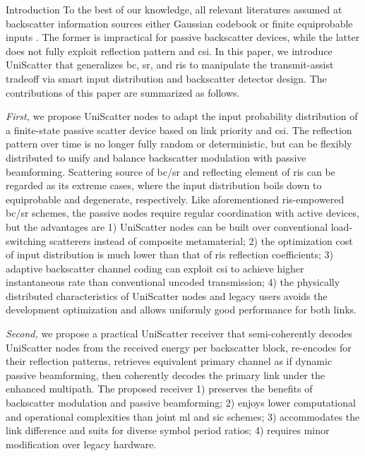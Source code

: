 \documentclass[journal]{IEEEtran}
\begin{document}
\begin{section}{Introduction}
	To the best of our knowledge, all relevant literatures assumed at backscatter information sources either Gaussian codebook \cite{Guo2019b,Ding2020,Long2020a,Zhou2019a,Wu2021a,Xu2021a,Yang2021a,Hu2021b} or finite equiprobable inputs \cite{Yang2018,Liang2020,Han2021,Zhang2022,Liu2019d,Bereyhi2020,Xu2020b,Zhang2021d,Hua2022,Basar2020,Ma2020a,Yuan2021,Hu2021a}.
	The former is impractical for passive backscatter devices, while the latter does not fully exploit reflection pattern and \gls{csi}.
	In this paper, we introduce UniScatter that generalizes \gls{bc}, \gls{sr}, and \gls{ris} to manipulate the transmit-assist tradeoff via smart input distribution and backscatter detector design.
	The contributions of this paper are summarized as follows.

	\emph{First,} we propose UniScatter nodes to adapt the input probability distribution of a finite-state passive scatter device based on link priority and \gls{csi}.
	The reflection pattern over time is no longer fully random or deterministic, but can be flexibly distributed to unify and balance backscatter modulation with passive beamforming.
	Scattering source of \gls{bc}/\gls{sr} and reflecting element of \gls{ris} can be regarded as its extreme cases, where the input distribution boils down to equiprobable and degenerate, respectively.
	Like aforementioned \gls{ris}-empowered \gls{bc}/\gls{sr} schemes, the passive nodes require regular coordination with active devices, but the advantages are 1) UniScatter nodes can be built over conventional load-switching scatterers instead of composite metamaterial; 2) the optimization cost of input distribution is much lower than that of \gls{ris} reflection coefficients; 3) adaptive backscatter channel coding can exploit \gls{csi} to achieve higher instantaneous rate than conventional uncoded transmission; 4) the physically distributed characteristics of UniScatter nodes and legacy users avoids the development optimization and allows uniformly good performance for both links.

	\emph{Second,} we propose a practical UniScatter receiver that semi-coherently decodes UniScatter nodes from the received energy per backscatter block, re-encodes for their reflection patterns, retrieves equivalent primary channel as if dynamic passive beamforming, then coherently decodes the primary link under the enhanced multipath.
	The proposed receiver 1) preserves the benefits of backscatter modulation and passive beamforming; 2) enjoys lower computational and operational complexities than joint \gls{ml} and \gls{sic} schemes; 3) accommodates the link difference and suits for diverse symbol period ratios; 4) requires minor modification over legacy hardware.


\end{section}
\end{document}
